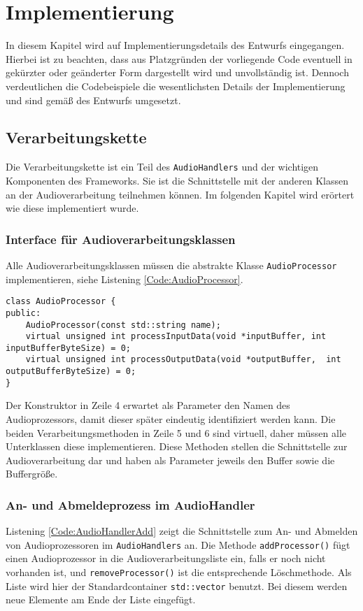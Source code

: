 \chapter{Implementierung}
In diesem Kapitel wird auf Implementierungsdetails des Entwurfs eingegangen. Hierbei ist zu beachten, dass aus Platzgründen der vorliegende Code eventuell in gekürzter oder geänderter Form dargestellt wird und unvollständig ist. Dennoch verdeutlichen die Codebeispiele die wesentlichsten Details der Implementierung und sind gemäß des Entwurfs umgesetzt.

\section{Verarbeitungskette}
Die Verarbeitungskette ist ein Teil des \texttt{AudioHandlers} und der wichtigen Komponenten des Frameworks. Sie ist die Schnittstelle mit der anderen Klassen an der Audioverarbeitung teilnehmen können. Im folgenden Kapitel wird erörtert wie diese implementiert wurde.

\subsection{Interface für Audioverarbeitungsklassen}
Alle Audioverarbeitungsklassen müssen die abstrakte Klasse \texttt{AudioProcessor} implementieren, siehe Listening \ref{Code:AudioProcessor}.

\begin{lstlisting}[caption={Interface des AudioProcessors},label={Code:AudioProcessor}]
class AudioProcessor {
public:
	AudioProcessor(const std::string name);
	virtual unsigned int processInputData(void *inputBuffer, int inputBufferByteSize) = 0;
	virtual unsigned int processOutputData(void *outputBuffer,  int outputBufferByteSize) = 0;
}
\end{lstlisting}
Der Konstruktor in Zeile 4 erwartet als Parameter den Namen des Audioprozessors, damit dieser später eindeutig identifiziert werden kann. Die beiden Verarbeitungsmethoden in Zeile 5 und 6 sind virtuell, daher müssen alle Unterklassen diese implementieren. Diese Methoden stellen die Schnittstelle zur Audioverarbeitung dar und haben als Parameter jeweils den Buffer sowie die Buffergröße.

\subsection{An- und Abmeldeprozess im AudioHandler}
Listening \ref{Code:AudioHandlerAdd} zeigt die Schnittstelle zum An- und Abmelden von Audioprozessoren im \texttt{AudioHandlers} an. Die Methode \texttt{addProcessor()} fügt einen Audioprozessor in die Audioverarbeitungsliste ein, falls er noch nicht vorhanden ist, und \texttt{removeProcessor()} ist die entsprechende Löschmethode. Als Liste wird hier der Standardcontainer \texttt{std::vector} benutzt. Bei diesem werden neue Elemente am Ende der Liste eingefügt.

